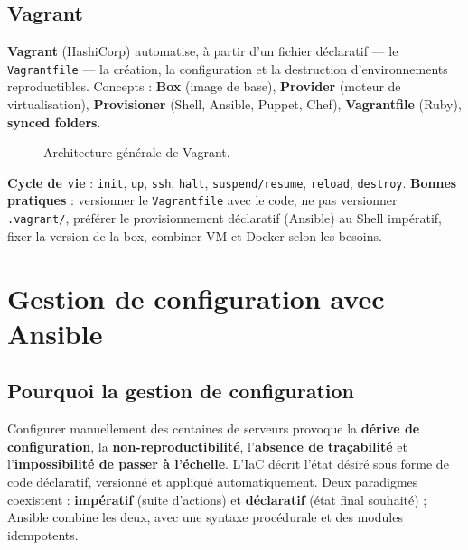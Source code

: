 \documentclass[11pt,a4paper]{article}
\begin{document}
\subsection{Vagrant}
\textbf{Vagrant} (HashiCorp) automatise, à partir d'un fichier déclaratif --- le \texttt{Vagrantfile} ---
la création, la configuration et la destruction d'environnements reproductibles. Concepts :
\textbf{Box} (image de base), \textbf{Provider} (moteur de virtualisation), \textbf{Provisioner}
(Shell, Ansible, Puppet, Chef), \textbf{Vagrantfile} (Ruby), \textbf{synced folders}.

\begin{figure}[h]\centering
{}
\caption{Architecture générale de Vagrant.}
\end{figure}

\textbf{Cycle de vie} : \texttt{init}, \texttt{up}, \texttt{ssh}, \texttt{halt}, \texttt{suspend/resume},
\texttt{reload}, \texttt{destroy}. \textbf{Bonnes pratiques} : versionner le \texttt{Vagrantfile} avec le
code, ne pas versionner \texttt{.vagrant/}, préférer le provisionnement déclaratif (Ansible) au Shell
impératif, fixer la version de la box, combiner VM et Docker selon les besoins.

\section{Gestion de configuration avec Ansible}

\subsection{Pourquoi la gestion de configuration}
Configurer manuellement des centaines de serveurs provoque la \textbf{dérive de configuration}, la
\textbf{non-reproductibilité}, l'\textbf{absence de traçabilité} et l'\textbf{impossibilité de passer à
l'échelle}. L'IaC décrit l'état désiré sous forme de code déclaratif, versionné et appliqué
automatiquement. Deux paradigmes coexistent : \textbf{impératif} (suite d'actions) et \textbf{déclaratif}
(état final souhaité) ; Ansible combine les deux, avec une syntaxe procédurale et des modules idempotents.
\end{document}
